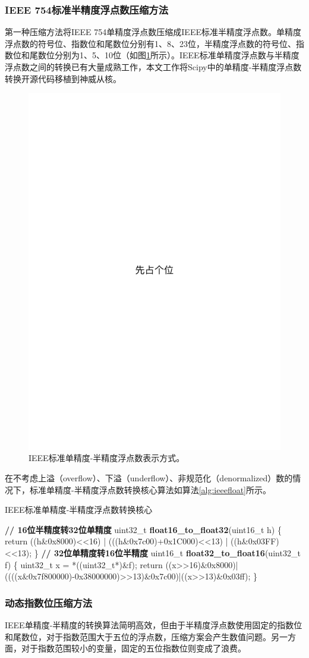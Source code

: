 \documentclass[degree=doctor]{thuthesis}
\begin{document}
\subsubsection{IEEE 754标准半精度浮点数压缩方法}
第一种压缩方法将IEEE 754单精度浮点数压缩成IEEE标准半精度浮点数。单精度浮点数的符号位、指数位和尾数位分别有1、8、23位，半精度浮点数的符号位、指数位和尾数位分别为1、5、10位（如图\ref{fig:ieeefloathalf}所示）。IEEE标准单精度浮点数与半精度浮点数之间的转换已有大量成熟工作\cite{van2008fast}，本文工作将Scipy\cite{jones2014scipy}中的单精度-半精度浮点数转换开源代码移植到神威从核。

\begin{figure}[ht]
\centering
\includegraphics[width=0.3\columnwidth]{figures/placeholder.pdf}
\caption{IEEE标准单精度-半精度浮点数表示方式。}
\label{fig:ieeefloathalf}
\end{figure}

在不考虑上溢（overflow）、下溢（underflow）、非规范化（denormalized）数的情况下，标准单精度-半精度浮点数转换核心算法如算法\ref{alg:ieeefloat}所示。
\begin{algorithm}[ht]
\small
\caption{IEEE标准单精度-半精度浮点数转换核心}\label{alg:ieeefloat}
\begin{algorithmic}[1]
\State \textbf{// 16位半精度转32位单精度}
\State uint32\_t \textbf{float16\_to\_float32}(uint16\_t h) \{
\State \quad\quad return ((h\&0x8000)<<16) | (((h\&0x7c00)+0x1C000)<<13) | ((h\&0x03FF)<<13); 
\State \}
\State
\State \textbf{// 32位单精度转16位半精度}
\State uint16\_t \textbf{float32\_to\_float16}(uint32\_t f) \{
\State \quad\quad uint32\_t x = *((uint32\_t*)\&f);
\State \quad\quad return ((x>>16)\&0x8000)|((((x\&0x7f800000)-0x38000000)>>13)\&0x7c00)|((x>>13)\&0x03ff);
\State \}
\end{algorithmic}
\end{algorithm}

\subsubsection{动态指数位压缩方法}
IEEE单精度-半精度的转换算法简明高效，但由于半精度浮点数使用固定的指数位和尾数位，对于指数范围大于五位的浮点数，压缩方案会产生数值问题。另一方面，对于指数范围较小的变量，固定的五位指数位则变成了浪费。
\end{document}
